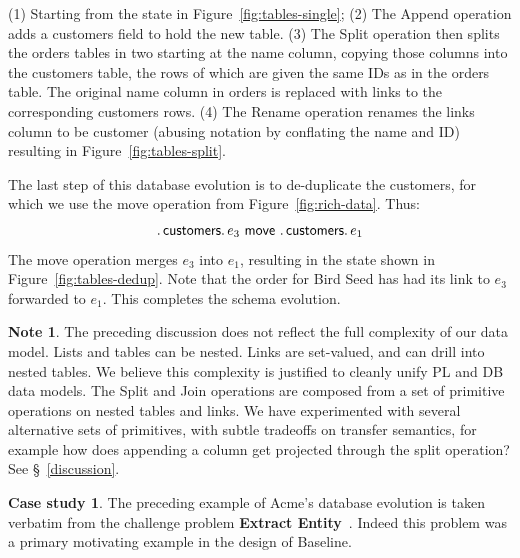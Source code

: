\documentclass[english,submission]{programming}
\theoremstyle{definition}
\newtheorem*{note}{Note}
\newtheorem{casestudy}{Case study}
\newcommand{\mathbox}[1]{\colorbox{black!10}{$#1$\phantom{i\hspace{-3.5pt}}}}
\DeclareMathOperator{\exec}{\ \fatsemi\ \ }
\newcommand{\is}{{:}\ }
\newcommand{\quotedstring}[1]{\textsf{\textquotedbl{#1}\textquotedbl}}
\begin{document}

(1) Starting from the state in Figure~\ref{fig:tables-single};
(2) The \textsf{Append} operation adds a \textsf{customers} field to hold the new table. (3) The \textsf{Split} operation then splits the \textsf{orders} tables in two starting at the \textsf{name} column, copying those columns into the \textsf{customers} table, the rows of which are given the same IDs as in the \textsf{orders} table.
The original \textsf{name} column in \textsf{orders} is replaced with links to the corresponding \textsf{customers} rows.
(4) The \textsf{Rename} operation renames the links column to be \textsf{customer} (abusing notation by conflating the name and ID) resulting in
Figure~\ref{fig:tables-split}.

The last step of this database evolution is to de-duplicate the customers, for which we use the \textsf{move} operation from Figure~\ref{fig:rich-data}. Thus:
\[
\ldotp \textsf{customers}\ldotp e_3 \textsf{ move } \ldotp \textsf{customers}\ldotp e_1
\]
The \textsf{move} operation merges \mathbox{e_3} into \mathbox{e_1}, resulting in the state shown in  Figure~\ref{fig:tables-dedup}. Note that the order for Bird Seed has had its link to \mathbox{e_3} forwarded to \mathbox{e_1}. This completes the schema evolution.

\begin{note}
The preceding discussion does not reflect the full complexity of our data model. Lists and tables can be nested. Links are set-valued, and can drill into nested tables. We believe this complexity is justified to cleanly unify PL and DB data models. The \textsf{Split} and \textsf{Join} operations are composed from a set of primitive operations on nested tables and links. We have experimented with several alternative sets of primitives, with subtle tradeoffs on transfer semantics, for example how does appending a column get projected through the split operation? See \S~\ref{discussion}.
\end{note}


\begin{casestudy}\label{case-extract}
The preceding example of Acme's database evolution is taken verbatim from the challenge problem \textbf{Extract Entity}~\cite{challenge-problems}. Indeed this problem was a primary motivating example in the design of Baseline.
\end{casestudy}
\end{document}
